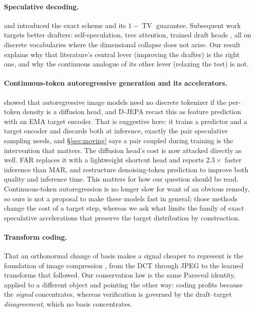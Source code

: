 \documentclass[10pt]{article}
\DeclareMathOperator{\TV}{TV}
\begin{document}
\paragraph{Speculative decoding.} \citet{leviathan2023fast} and \citet{chen2023accelerating}
introduced the exact scheme and its $1 - \TV$ guarantee. Subsequent work targets better drafters:
self-speculation, tree attention, trained draft heads \citep{cai2024medusa,li2024eagle}, all on
discrete vocabularies where the dimensional collapse does not arise. Our result explains why that
literature's central lever (improving the drafter) is the right one, and why the continuous analogue
of its other lever (relaxing the test) is not.

\paragraph{Continuous-token autoregressive generation and its accelerators.}
\citet{li2024autoregressive} showed that autoregressive image models need no discrete tokenizer if
the per-token density is a diffusion head, and D-JEPA \citep{li2025djepa} recast this as feature
prediction with an EMA target encoder. That is suggestive here: it trains a predictor and a target
encoder and discards both at inference, exactly the pair speculative sampling needs, and
\S\ref{sec:moving} says a pair coupled during training is the intervention that matters. The
diffusion head's cost is now attacked directly as well. FAR \citep{hang2025far} replaces it with a
lightweight shortcut head and reports $2.3\times$ faster inference than MAR, and
\citet{yao2025denoising} restructure denoising-token prediction to improve both quality and
inference time. This matters for how our question should be read. Continuous-token autoregression is
no longer slow for want of an obvious remedy, so ours is not a proposal to make these models fast in
general; those methods change the cost of a target step, whereas we ask what limits the family of
exact speculative accelerations that preserve the target distribution by construction.

\paragraph{Transform coding.} That an orthonormal change of basis makes a signal cheaper to represent
is the foundation of image compression \citep{goyal2001transform}, from the DCT
\citep{ahmed1974discrete} through JPEG \citep{wallace1992jpeg} to the learned transforms that followed.
Our conservation law is the same Parseval identity, applied to a different object and pointing the
other way: coding profits because the \emph{signal} concentrates, whereas verification is governed by
the draft--target \emph{disagreement}, which no basis concentrates.
\end{document}
